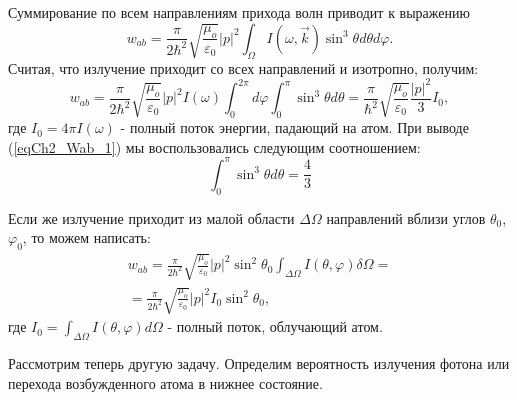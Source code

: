 Суммирование по всем направлениям прихода волн приводит к выражению
\begin{equation}
w_{ab} = \frac{\pi}{2 \hbar^2}\sqrt{\frac{\mu_o}{\varepsilon_0}}
\left|p\right|^2
\int_{\Omega}I\left(\omega, \vec{k}\right)
\sin^3 \theta d \theta d \varphi.
\end{equation}
Считая, что излучение приходит со всех направлений и изотропно, 
получим: 
\begin{equation}
w_{ab} = \frac{\pi}{2 \hbar^2}\sqrt{\frac{\mu_o}{\varepsilon_0}}
\left|p\right|^2 I\left(\omega\right)
\int_{0}^{2 \pi}d \varphi \int_0^{\pi}
\sin^3 \theta d \theta = 
\frac{\pi}{ \hbar^2}\sqrt{\frac{\mu_o}{\varepsilon_0}}
\frac{\left|p\right|^2}{3}I_0,
\label{eqCh2_Wab_1}
\end{equation}
где $I_0 = 4 \pi I\left(\omega\right)$ - полный поток энергии,
падающий на атом. При выводе  (\ref{eqCh2_Wab_1})
мы воспользовались следующим соотношением:
\[
 \int_0^{\pi}
\sin^3 \theta d \theta = \frac{4}{3}
\]

Если же излучение приходит из малой области
$\Delta \Omega$ направлений вблизи углов $\theta_0$, $\varphi_0$, то 
можем написать:  
\begin{eqnarray}
w_{ab} = \frac{\pi}{2 \hbar^2}\sqrt{\frac{\mu_o}{\varepsilon_0}}
\left|p\right|^2 \sin^2 \theta_0
\int_{\Delta \Omega} I\left(\theta, \varphi\right)
\delta \Omega = 
\nonumber \\
= 
\frac{\pi}{2 \hbar^2}\sqrt{\frac{\mu_o}{\varepsilon_0}}
\left|p\right|^2  I_0 \sin^2 \theta_0,
\label{eqCh2_Wab_2}
\end{eqnarray}
где $I_0 = \int_{\Delta \Omega} I\left(\theta, \varphi\right)
d \Omega$ -  полный поток, облучающий атом.

Рассмотрим теперь другую задачу. Определим вероятность излучения
фотона или перехода возбужденного атома в нижнее состояние.  

